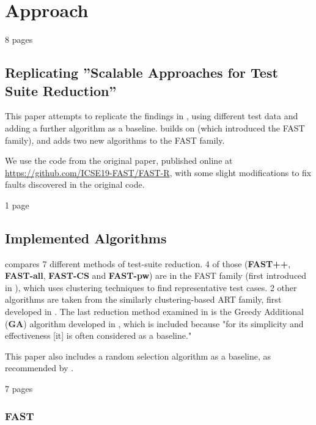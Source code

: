 
\chapter{Approach}\label{chapter:approach}

8 pages

\section{Replicating ''Scalable Approaches for Test Suite Reduction''}

This paper attempts to replicate the findings in
\cite{cruciani2019scalable}, using different test data and adding a
further algorithm as a baseline. \cite{cruciani2019scalable} builds on
\cite{miranda2018fast} (which introduced the FAST family), and adds two
new algorithms to the FAST family.

We use the code from the original paper, published online at
\url{https://github.com/ICSE19-FAST/FAST-R}, with some slight
modifications to fix faults discovered in the original code.

1 page

\section{Implemented Algorithms}

\cite{cruciani2019scalable} compares 7 different methods of
test-suite reduction. 4 of those (\textbf{FAST++}, \textbf{FAST-all},
\textbf{FAST-CS} and \textbf{FAST-pw}) are in the FAST family
(first introduced in \cite{miranda2018fast}), which uses clustering
techniques to find representative test cases. 2 other algorithms are
taken from the similarly clustering-based ART family, first developed
in \cite{chen2010adaptive}. The last reduction method examined in
\cite{cruciani2019scalable} is the Greedy Additional (\textbf{GA})
algorithm developed in \cite{rothermel2001prioritizing}, which is included
because "for its simplicity and effectiveness [it] is often considered
as a baseline."

This paper also includes a random selection algorithm as a baseline,
as recommended by \cite{khan2018systematic}.

7 pages

\subsection{FAST}

